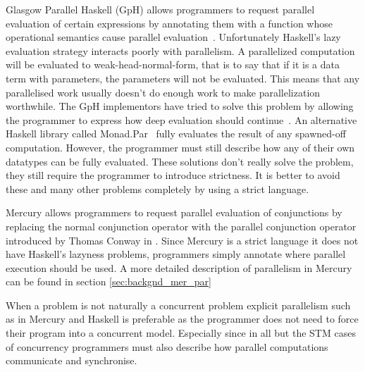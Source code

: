 Glasgow Parallel Haskell (GpH) allows programmers to request parallel
evaluation of certain expressions by annotating them with a function
whose operational semantics cause parallel
evaluation~\cite{gph,loidi:2008:gph-semiexplicit-parallelism}.
Unfortunately Haskell's lazy evaluation strategy interacts poorly with
parallelism.
A parallelized computation will be evaluated to weak-head-normal-form,
that is to say that if it is a data term with parameters,
the parameters will not be evaluated.
This means that any parallelised work usually doesn't do enough work to
make parallelization worthwhile.
The GpH implementors have tried to solve this problem by allowing
the programmer to express how deep evaluation should
continue~\cite{trinder:1998:strategies}.
An alternative Haskell library called Monad.Par~\cite{marlow:monadpar}
fully evaluates the result of any spawned-off computation.
However, the programmer must still describe how any of their own
datatypes can be fully evaluated.
These solutions don't really solve the problem,
they still require the programmer to introduce strictness.
It is better to avoid these and many other problems completely by using
a strict language.

\label{ref:parallel_conjunction}
Mercury allows programmers to request parallel evaluation of
conjunctions by replacing the normal conjunction operator with the
parallel conjunction operator introduced by Thomas Conway in
\cite{conway:parallel-mercury,wang:parallel-mercury,wang:indep-and-par}.
Since Mercury is a strict language it does not have Haskell's
lazyness problems,
programmers simply annotate where parallel execution
should be used.
A more detailed description of parallelism in Mercury can be found in
section \ref{sec:backgnd_mer_par}

When a problem is not naturally a concurrent problem 
explicit parallelism such as in Mercury and Haskell
is preferable as the programmer does not need to force their program
into a concurrent model.
Especially since in all but the STM cases of concurrency programmers
must also describe how parallel computations communicate and
synchronise.

